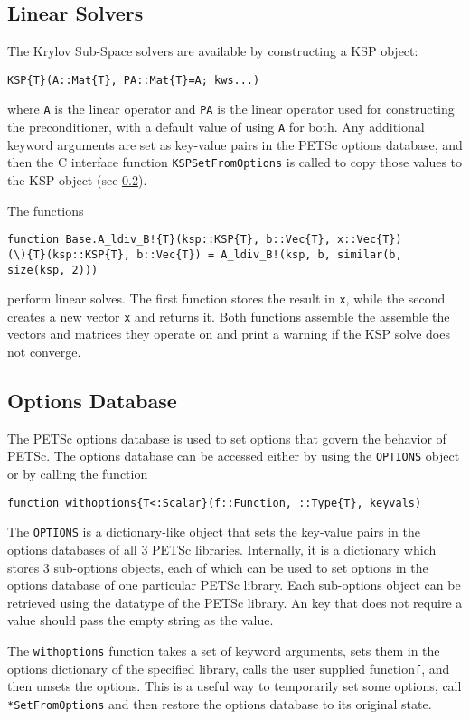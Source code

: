 \documentclass{article}
\newcommand{\ttt}{\texttt}
\begin{document}
\subsection{Linear Solvers} \label{sec:ksp}
The Krylov Sub-Space solvers are available by constructing a KSP object:
\begin{verbatim}
KSP{T}(A::Mat{T}, PA::Mat{T}=A; kws...)
\end{verbatim}

where \ttt{A} is the linear operator and \ttt{PA}  is the linear operator used for constructing the preconditioner, with a default value of using \ttt{A} for both.
Any additional keyword arguments are set as key-value pairs in the PETSc options database, and then the C interface function \ttt{KSPSetFromOptions} is called to copy those values to the KSP object (see \ref{sec:options}).

The functions
\begin{verbatim}
function Base.A_ldiv_B!{T}(ksp::KSP{T}, b::Vec{T}, x::Vec{T})
(\){T}(ksp::KSP{T}, b::Vec{T}) = A_ldiv_B!(ksp, b, similar(b, size(ksp, 2)))
\end{verbatim}
perform linear solves.
The first function stores the result in \ttt{x}, while the second creates a new vector \ttt{x} and returns it.
Both functions assemble the assemble the vectors and matrices they operate on and print a warning if the KSP solve does not converge.


\subsection{Options Database} \label{sec:options}
The PETSc options database is used to set options that govern the behavior of PETSc.
The options database can be accessed either by using the \ttt{OPTIONS} object or by calling the function 

\begin{verbatim}
function withoptions{T<:Scalar}(f::Function, ::Type{T}, keyvals)
\end{verbatim}

The \ttt{OPTIONS} is a dictionary-like object that sets the key-value pairs in the options databases of all 3 PETSc libraries.
Internally, it is a dictionary which stores 3 sub-options objects, each of which can be used to set options in the options database of one particular PETSc library.
Each sub-options object can be retrieved using the datatype of the PETSc library.
An key that does not require a value should pass the empty string as the value.

The \ttt{withoptions} function takes a set of keyword arguments, sets them in the options dictionary of the specified library, calls the user supplied function\ttt{f}, and then unsets the options.
This is a useful way to temporarily set some options, call \ttt{*SetFromOptions} and then restore the options database to its original state.
\end{document}
